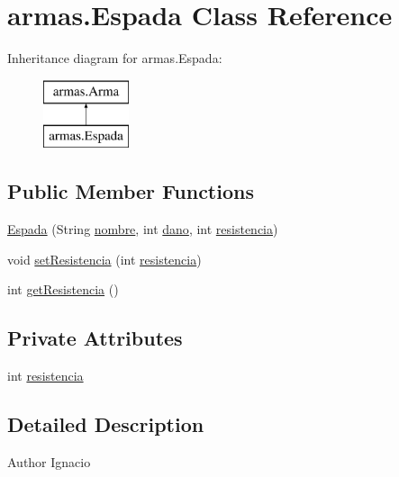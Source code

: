 \hypertarget{classarmas_1_1_espada}{}\section{armas.\+Espada Class Reference}
\label{classarmas_1_1_espada}
Inheritance diagram for armas.\+Espada\+:\begin{figure}[H]
\begin{center}
\leavevmode
\includegraphics[height=2.000000cm]{classarmas_1_1_espada}
\end{center}
\end{figure}
\subsection*{Public Member Functions}
\begin{DoxyCompactItemize}
\item 
\mbox{\hyperlink{classarmas_1_1_espada_a0f4b04c25f57f64a45de3c2ba3398fc2}{Espada}} (String \mbox{\hyperlink{classarmas_1_1_arma_abdd717c561a99a3436dbfda8129b5581}{nombre}}, int \mbox{\hyperlink{classarmas_1_1_arma_a59396ee4b222360f19c8be08eb7d137b}{dano}}, int \mbox{\hyperlink{classarmas_1_1_espada_a0d0a80a30cfd584c2b50023017919039}{resistencia}})
\item 
void \mbox{\hyperlink{classarmas_1_1_espada_a276f1d1418d8e991cf3a066d908d9a34}{set\+Resistencia}} (int \mbox{\hyperlink{classarmas_1_1_espada_a0d0a80a30cfd584c2b50023017919039}{resistencia}})
\item 
int \mbox{\hyperlink{classarmas_1_1_espada_a4a87b5949bb0e68aad87dbf2deb04e75}{get\+Resistencia}} ()
\end{DoxyCompactItemize}
\subsection*{Private Attributes}
\begin{DoxyCompactItemize}
\item 
int \mbox{\hyperlink{classarmas_1_1_espada_a0d0a80a30cfd584c2b50023017919039}{resistencia}}
\end{DoxyCompactItemize}


\subsection{Detailed Description}
\begin{DoxyAuthor}{Author}
Ignacio 
\end{DoxyAuthor}


